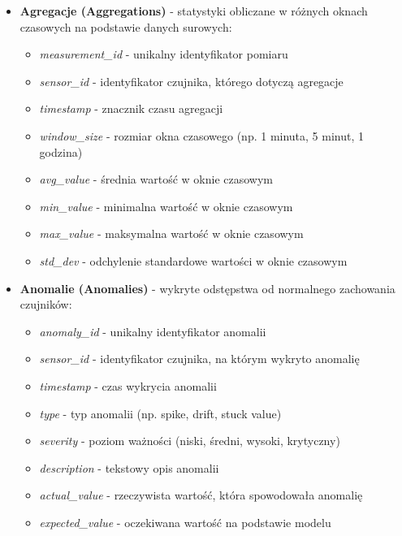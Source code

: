 \begin{itemize}
    \item \textbf{Agregacje (Aggregations)} - statystyki obliczane w różnych oknach czasowych na podstawie danych surowych:
    \begin{itemize}
        \item \textit{measurement\_id} - unikalny identyfikator pomiaru
        \item \textit{sensor\_id} - identyfikator czujnika, którego dotyczą agregacje
        \item \textit{timestamp} - znacznik czasu agregacji
        \item \textit{window\_size} - rozmiar okna czasowego (np. 1 minuta, 5 minut, 1 godzina)
        \item \textit{avg\_value} - średnia wartość w oknie czasowym
        \item \textit{min\_value} - minimalna wartość w oknie czasowym
        \item \textit{max\_value} - maksymalna wartość w oknie czasowym
        \item \textit{std\_dev} - odchylenie standardowe wartości w oknie czasowym
    \end{itemize}
    
    \item \textbf{Anomalie (Anomalies)} - wykryte odstępstwa od normalnego zachowania czujników:
    \begin{itemize}
        \item \textit{anomaly\_id} - unikalny identyfikator anomalii
        \item \textit{sensor\_id} - identyfikator czujnika, na którym wykryto anomalię
        \item \textit{timestamp} - czas wykrycia anomalii
        \item \textit{type} - typ anomalii (np. spike, drift, stuck value)
        \item \textit{severity} - poziom ważności (niski, średni, wysoki, krytyczny)
        \item \textit{description} - tekstowy opis anomalii
        \item \textit{actual\_value} - rzeczywista wartość, która spowodowała anomalię
        \item \textit{expected\_value} - oczekiwana wartość na podstawie modelu
    \end{itemize}
    

\end{itemize}

